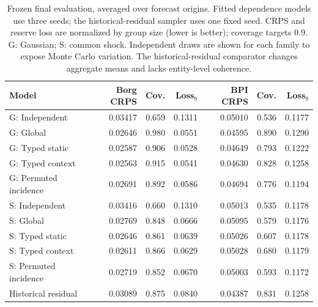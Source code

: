 \begin{table}[t]
\centering\small
\caption{Frozen final evaluation, averaged over forecast origins. Fitted dependence models use three seeds; the historical-residual sampler uses one fixed seed. CRPS and reserve loss are normalized by group size (lower is better); coverage targets 0.9. G: Gaussian; S: common shock. Independent draws are shown for each family to expose Monte Carlo variation. The historical-residual comparator changes aggregate means and lacks entity-level coherence.}\label{tab:main}
\begin{tabular}{lrrrrrr}
\toprule
Model & Borg CRPS & Cov. & Loss$_9$ & BPI CRPS & Cov. & Loss$_9$ \\
\midrule
G: Independent & 0.03417 & 0.659 & 0.1311 & 0.05010 & 0.536 & 0.1177 \\
G: Global & 0.02646 & 0.980 & 0.0551 & 0.04595 & 0.890 & 0.1290 \\
G: Typed static & 0.02587 & 0.906 & 0.0528 & 0.04649 & 0.793 & 0.1222 \\
G: Typed context & 0.02563 & 0.915 & 0.0541 & 0.04630 & 0.828 & 0.1258 \\
G: Permuted incidence & 0.02691 & 0.892 & 0.0586 & 0.04694 & 0.776 & 0.1194 \\
S: Independent & 0.03416 & 0.660 & 0.1310 & 0.05013 & 0.535 & 0.1178 \\
S: Global & 0.02769 & 0.848 & 0.0666 & 0.05095 & 0.579 & 0.1176 \\
S: Typed static & 0.02646 & 0.861 & 0.0639 & 0.05026 & 0.607 & 0.1178 \\
S: Typed context & 0.02611 & 0.866 & 0.0629 & 0.05028 & 0.680 & 0.1179 \\
S: Permuted incidence & 0.02719 & 0.852 & 0.0670 & 0.05003 & 0.593 & 0.1172 \\
Historical residual & 0.03089 & 0.875 & 0.0840 & 0.04387 & 0.831 & 0.1258 \\
\bottomrule
\end{tabular}
\end{table}
